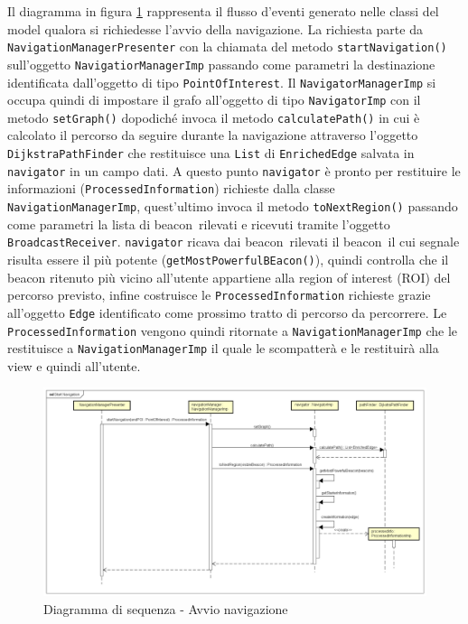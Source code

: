 \documentclass[../DefinizioneDiProdotto.tex]{subfiles}
\begin{document}
		Il diagramma in figura \ref{StartNavigation} rappresenta il flusso d'eventi generato nelle classi del model qualora si richiedesse l'avvio della navigazione. La richiesta parte da \verb|NavigationManagerPresenter| con la chiamata del metodo \verb|startNavigation()| sull'oggetto \verb|NavigatiorManagerImp| passando come parametri la destinazione identificata dall'oggetto di tipo \verb|PointOfInterest|. Il \verb|NavigatorManagerImp| si occupa quindi di impostare il grafo all'oggetto di tipo \verb|NavigatorImp| con il metodo \verb|setGraph()| dopodiché invoca il metodo \verb|calculatePath()| in cui è calcolato il percorso da seguire durante la navigazione attraverso l'oggetto \verb|DijkstraPathFinder| che restituisce una \verb|List| di \verb|EnrichedEdge| salvata in \verb|navigator| in un campo dati.
		A questo punto \verb|navigator| è pronto per restituire le informazioni (\verb|ProcessedInformation|) richieste dalla classe \verb|NavigationManagerImp|, quest'ultimo invoca il metodo \verb|toNextRegion()| passando come parametri la lista di beacon\g\ rilevati e ricevuti tramite l'oggetto \verb|BroadcastReceiver|.
		\verb|navigator| ricava dai beacon\g\ rilevati il beacon\g\ il cui segnale risulta essere il più potente (\verb|getMostPowerfulBEacon()|), quindi controlla che il beacon ritenuto più vicino all'utente appartiene alla region of interest (ROI\g) del percorso previsto, infine costruisce le \verb|ProcessedInformation| richieste grazie all'oggetto \verb|Edge| identificato come prossimo tratto di percorso da percorrere.
		Le \verb|ProcessedInformation| vengono quindi ritornate a \verb|NavigationManagerImp| che le restituisce a \verb|NavigationManagerImp| il quale le scompatterà e le restituirà alla view e quindi all'utente.
	
		\begin{figure} [h]
			\includegraphics[width=\textwidth]{diagrams/StartNavigation}
			\caption{Diagramma di sequenza - Avvio navigazione}
			\label{StartNavigation}
		\end{figure}
		
		
\end{document}
